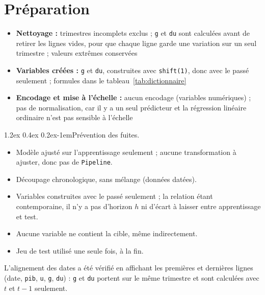 \documentclass[11pt,a4paper]{article}
\makeatletter
\renewcommand\paragraph{\@startsection{paragraph}{4}{\z@}%
  {1.2ex \@plus 0.4ex \@minus 0.2ex}{-1em}{\normalfont\normalsize\bfseries}}
\makeatother
\begin{document}
\section{Préparation}
\label{sec:preparation}
\begin{itemize}
  \item \textbf{Nettoyage :} trimestres incomplets exclus ; \texttt{g} et \texttt{du} sont calculées avant de retirer les lignes vides, pour que chaque ligne garde une variation sur un seul trimestre ; valeurs extrêmes conservées
  \item \textbf{Variables créées :} \texttt{g} et \texttt{du}, construites avec \texttt{shift(1)}, donc avec le passé seulement ; formules dans le tableau~\ref{tab:dictionnaire}
  \item \textbf{Encodage et mise à l'échelle :} aucun encodage (variables numériques) ; pas de normalisation, car il y a un seul prédicteur et la régression linéaire ordinaire n'est pas sensible à l'échelle
\end{itemize}

\paragraph{Prévention des fuites.}
\begin{itemize}
  \item[$\boxtimes$] Modèle ajusté sur l'apprentissage seulement ; aucune transformation à ajuster, donc pas de \texttt{Pipeline}.
  \item[$\boxtimes$] Découpage chronologique, sans mélange (données datées).
  \item[$\boxtimes$] Variables construites avec le passé seulement ; la relation étant contemporaine, il n'y a pas d'horizon $h$ ni d'écart à laisser entre apprentissage et test.
  \item[$\boxtimes$] Aucune variable ne contient la cible, même indirectement.
  \item[$\boxtimes$] Jeu de test utilisé une seule fois, à la fin.
\end{itemize}
L'alignement des dates a été vérifié en affichant les premières et dernières lignes (date, \texttt{pib}, \texttt{u}, \texttt{g}, \texttt{du}) : \texttt{g} et \texttt{du} portent sur le même trimestre et sont calculées avec $t$ et $t-1$ seulement.

\end{document}
